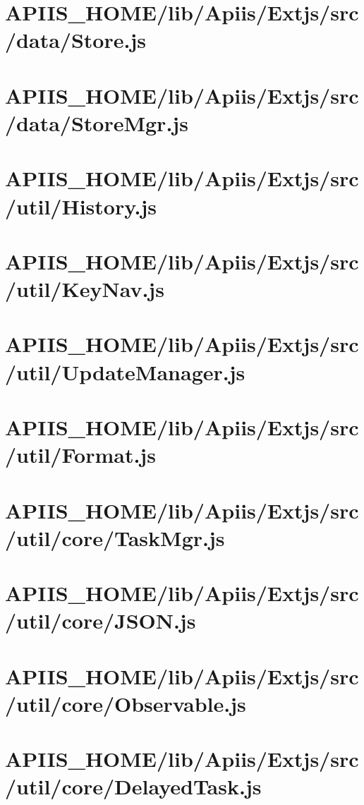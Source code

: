 \section{APIIS\_HOME/lib/Apiis/Extjs/src/data/Store.js} 
\section{APIIS\_HOME/lib/Apiis/Extjs/src/data/StoreMgr.js} 
\section{APIIS\_HOME/lib/Apiis/Extjs/src/util/History.js} 
\section{APIIS\_HOME/lib/Apiis/Extjs/src/util/KeyNav.js} 
\section{APIIS\_HOME/lib/Apiis/Extjs/src/util/UpdateManager.js} 
\section{APIIS\_HOME/lib/Apiis/Extjs/src/util/Format.js} 
\section{APIIS\_HOME/lib/Apiis/Extjs/src/util/core/TaskMgr.js} 
\section{APIIS\_HOME/lib/Apiis/Extjs/src/util/core/JSON.js} 
\section{APIIS\_HOME/lib/Apiis/Extjs/src/util/core/Observable.js} 
\section{APIIS\_HOME/lib/Apiis/Extjs/src/util/core/DelayedTask.js} 
